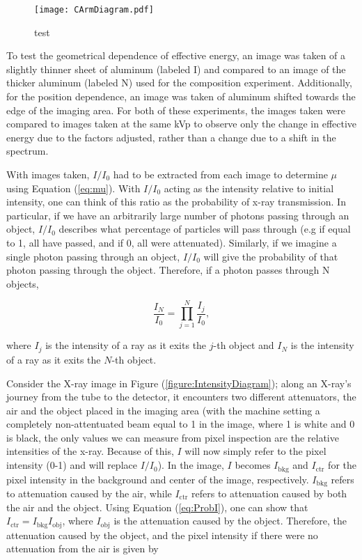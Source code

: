 \begin{figure}[H]
    \centering
	\texttt{[image: CArmDiagram.pdf]}
	\caption{test}
	\label{figure:CArmDiagram}
\end{figure}

To test the geometrical dependence of effective energy, an image was taken of a slightly thinner sheet of aluminum (labeled I) and compared to an image of the thicker aluminum (labeled N) used for the composition experiment. Additionally, for the position dependence, an image was taken of aluminum shifted towards the edge of the imaging area. For both of these experiments, the images taken were compared to images taken at the same kVp to observe only the change in effective energy due to the factors adjusted, rather than a change due to a shift in the spectrum.

With images taken, $I/I_0$ had to be extracted from each image to determine $\mu$ using Equation (\ref{eq:mu}). With $I/I_0$ acting as the intensity relative to initial intensity, one can think of this ratio as the probability of x-ray transmission. In particular, if we have an arbitrarily large number of photons passing through an object, $I/I_0$ describes what percentage of particles will pass through (e.g if equal to 1, all have passed, and if 0, all were attenuated). Similarly, if we imagine a single photon passing through an object, $I/I_0$ will give the probability of that photon passing through the object. Therefore, if a photon passes through N objects, 

\begin{equation}
    \frac{I_N}{I_0} = \prod_{j=1}^{N} \frac{I_j}{I_0},
   \label{eq:ProbI}
\end{equation}

where $I_j$ is the intensity of a ray as it exits the $j$-th object and $I_N$ is the intensity of a ray as it exits the $N$-th object.

Consider the X-ray image in Figure (\ref{figure:IntensityDiagram}); along an X-ray's journey from the tube to the detector, it encounters two different attenuators, the air and the object placed in the imaging area (with the machine setting a completely non-attentuated beam equal to 1 in the image, where 1 is white and 0 is black, the only values we can measure from pixel inspection are the relative intensities of the x-ray. Because of this, $I$ will now simply refer to the pixel intensity (0-1) and will replace $I/I_0$). In the image, $I$ becomes $I_{\text{bkg}}$ and $I_{\text{ctr}}$ for the pixel intensity in the background and center of the image, respectively. $I_{\text{bkg}}$ refers to attenuation caused by the air, while $I_{\text{ctr}}$ refers to attenuation caused by both the air and the object. Using Equation (\ref{eq:ProbI}), one can show that $I_{\text{ctr}} = I_{\text{bkg}} I_{\text{obj}}$, where $I_{\text{obj}}$ is the attenuation caused by the object. Therefore, the attenuation caused by the object, and the pixel intensity if there were no attenuation from the air is given by

